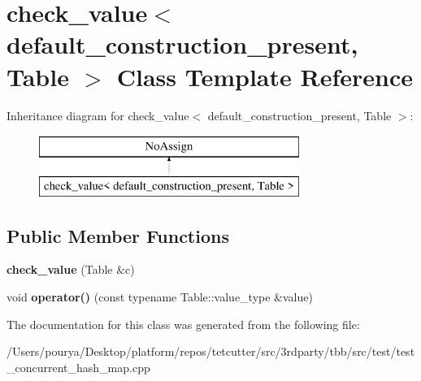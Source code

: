 \hypertarget{classcheck__value}{}\section{check\+\_\+value$<$ default\+\_\+construction\+\_\+present, Table $>$ Class Template Reference}
\label{classcheck__value}
Inheritance diagram for check\+\_\+value$<$ default\+\_\+construction\+\_\+present, Table $>$\+:\begin{figure}[H]
\begin{center}
\leavevmode
\includegraphics[height=2.000000cm]{classcheck__value}
\end{center}
\end{figure}
\subsection*{Public Member Functions}
\begin{DoxyCompactItemize}
\item 
\hypertarget{classcheck__value_a58d9e96a6508531126b849055267fbe1}{}{\bfseries check\+\_\+value} (Table \&c)\label{classcheck__value_a58d9e96a6508531126b849055267fbe1}

\item 
\hypertarget{classcheck__value_a8b868d39684dde77beaccc9516395045}{}void {\bfseries operator()} (const typename Table\+::value\+\_\+type \&value)\label{classcheck__value_a8b868d39684dde77beaccc9516395045}

\end{DoxyCompactItemize}


The documentation for this class was generated from the following file\+:\begin{DoxyCompactItemize}
\item 
/\+Users/pourya/\+Desktop/platform/repos/tetcutter/src/3rdparty/tbb/src/test/test\+\_\+concurrent\+\_\+hash\+\_\+map.\+cpp\end{DoxyCompactItemize}
